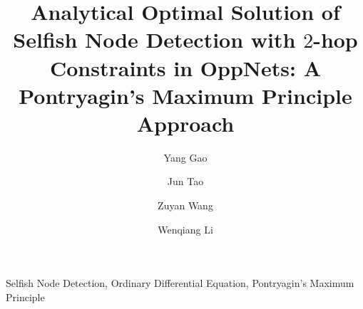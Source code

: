 \documentclass[conference]{IEEEtran}
\begin{document}
\title{Analytical Optimal Solution of Selfish Node Detection with $2$-hop Constraints in OppNets: A Pontryagin's Maximum Principle Approach
}
\author[1,2]{Yang Gao}
\author[1,2]{Jun Tao}
\author[1,2]{Zuyan Wang}
\author[1]{Wenqiang Li}



\maketitle



\begin{IEEEkeywords}
Selfish Node Detection, Ordinary Differential Equation,
Pontryagin's Maximum Principle
\end{IEEEkeywords}











\end{document}
